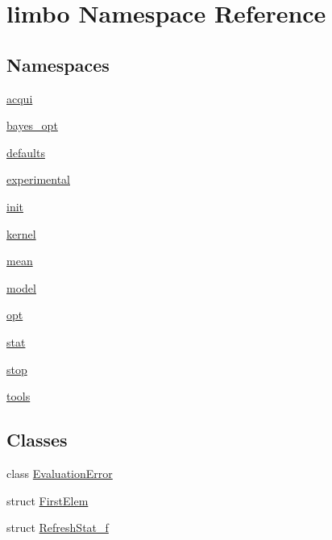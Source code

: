 \hypertarget{namespacelimbo}{}\section{limbo Namespace Reference}
\label{namespacelimbo}
\subsection*{Namespaces}
\begin{DoxyCompactItemize}
\item 
 \hyperlink{namespacelimbo_1_1acqui}{acqui}
\item 
 \hyperlink{namespacelimbo_1_1bayes__opt}{bayes\+\_\+opt}
\item 
 \hyperlink{namespacelimbo_1_1defaults}{defaults}
\item 
 \hyperlink{namespacelimbo_1_1experimental}{experimental}
\item 
 \hyperlink{namespacelimbo_1_1init}{init}
\item 
 \hyperlink{namespacelimbo_1_1kernel}{kernel}
\item 
 \hyperlink{namespacelimbo_1_1mean}{mean}
\item 
 \hyperlink{namespacelimbo_1_1model}{model}
\item 
 \hyperlink{namespacelimbo_1_1opt}{opt}
\item 
 \hyperlink{namespacelimbo_1_1stat}{stat}
\item 
 \hyperlink{namespacelimbo_1_1stop}{stop}
\item 
 \hyperlink{namespacelimbo_1_1tools}{tools}
\end{DoxyCompactItemize}
\subsection*{Classes}
\begin{DoxyCompactItemize}
\item 
class \hyperlink{classlimbo_1_1_evaluation_error}{Evaluation\+Error}
\item 
struct \hyperlink{structlimbo_1_1_first_elem}{First\+Elem}
\item 
struct \hyperlink{structlimbo_1_1_refresh_stat__f}{Refresh\+Stat\+\_\+f}
\end{DoxyCompactItemize}
